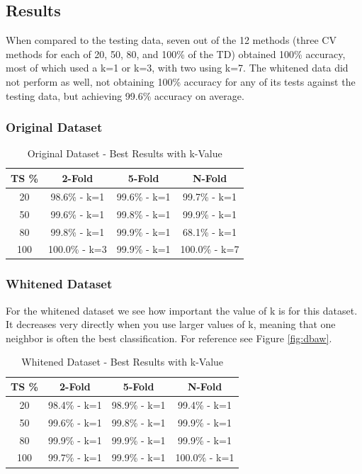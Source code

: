 \documentclass[conference]{acmsiggraph}
\begin{document}
\subsection {Results}
When compared to the testing data, seven out of the 12 methods (three CV methods for each of 20, 50, 80, and 100\% of the TD) obtained 100\% accuracy, most of which used a k=1 or k=3, with two using k=7. The whitened data did not perform as well, not obtaining 100\% accuracy for any of its tests against the testing data, but achieving 99.6\% accuracy on average.
\subsubsection{Original Dataset}
\begin{table}[h]
\caption{Original Dataset - Best Results with k-Value}
\centering
\begin{tabular}{c c c c}
\hline\hline
TS \% & 2-Fold & 5-Fold & N-Fold \\ [0.5ex]
\hline
20 & 98.6\% - k=1 & 99.6\% - k=1 & 99.7\% - k=1 \\
50 & 99.6\% - k=1 & 99.8\% - k=1 & 99.9\% - k=1 \\
80 & 99.8\% - k=1 & 99.9\% - k=1 & 68.1\% - k=1 \\
100 & 100.0\% - k=3 & 99.9\% - k=1 & 100.0\% - k=7 \\
\hline
\end{tabular}
\label{dba_n_res_table}
\end{table}
\subsubsection{Whitened Dataset}
For the whitened dataset we see how important the value of k is for this dataset. It decreases very directly when you use larger values of k, meaning that one neighbor is often the best classification. For reference see Figure \ref{fig:dbaw}.
\begin{table}[h]
\caption{Whitened Dataset - Best Results with k-Value}
\centering
\begin{tabular}{c c c c}
\hline\hline
TS \% & 2-Fold & 5-Fold & N-Fold \\ [0.5ex]
\hline
20 & 98.4\% - k=1 & 98.9\% - k=1 & 99.4\% - k=1 \\
50 & 99.6\% - k=1 & 99.8\% - k=1 & 99.9\% - k=1 \\
80 & 99.9\% - k=1 & 99.9\% - k=1 & 99.9\% - k=1 \\
100 & 99.7\% - k=1 & 99.9\% - k=1 & 100.0\% - k=1 \\
\hline
\end{tabular}
\label{dba_w_res_table}
\end{table}
\end{document}
